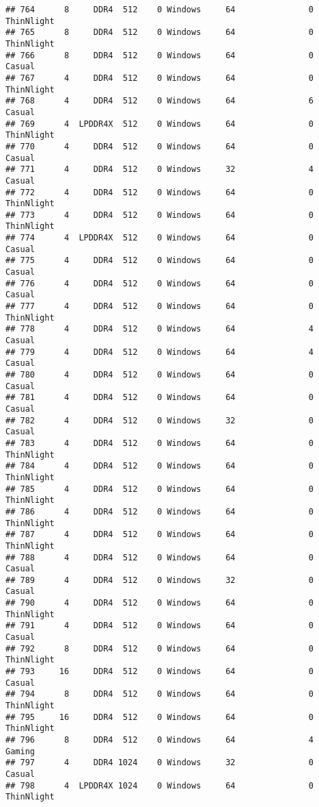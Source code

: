 \documentclass[
]{article}
\begin{document}
\begin{verbatim}
## 764      8     DDR4  512    0 Windows     64               0 ThinNlight
## 765      8     DDR4  512    0 Windows     64               0 ThinNlight
## 766      8     DDR4  512    0 Windows     64               0     Casual
## 767      4     DDR4  512    0 Windows     64               0 ThinNlight
## 768      4     DDR4  512    0 Windows     64               6     Casual
## 769      4  LPDDR4X  512    0 Windows     64               0 ThinNlight
## 770      4     DDR4  512    0 Windows     64               0     Casual
## 771      4     DDR4  512    0 Windows     32               4     Casual
## 772      4     DDR4  512    0 Windows     64               0 ThinNlight
## 773      4     DDR4  512    0 Windows     64               0 ThinNlight
## 774      4  LPDDR4X  512    0 Windows     64               0     Casual
## 775      4     DDR4  512    0 Windows     64               0     Casual
## 776      4     DDR4  512    0 Windows     64               0     Casual
## 777      4     DDR4  512    0 Windows     64               0 ThinNlight
## 778      4     DDR4  512    0 Windows     64               4     Casual
## 779      4     DDR4  512    0 Windows     64               4     Casual
## 780      4     DDR4  512    0 Windows     64               0     Casual
## 781      4     DDR4  512    0 Windows     64               0     Casual
## 782      4     DDR4  512    0 Windows     32               0     Casual
## 783      4     DDR4  512    0 Windows     64               0 ThinNlight
## 784      4     DDR4  512    0 Windows     64               0 ThinNlight
## 785      4     DDR4  512    0 Windows     64               0 ThinNlight
## 786      4     DDR4  512    0 Windows     64               0 ThinNlight
## 787      4     DDR4  512    0 Windows     64               0 ThinNlight
## 788      4     DDR4  512    0 Windows     64               0     Casual
## 789      4     DDR4  512    0 Windows     32               0     Casual
## 790      4     DDR4  512    0 Windows     64               0 ThinNlight
## 791      4     DDR4  512    0 Windows     64               0     Casual
## 792      8     DDR4  512    0 Windows     64               0 ThinNlight
## 793     16     DDR4  512    0 Windows     64               0     Casual
## 794      8     DDR4  512    0 Windows     64               0 ThinNlight
## 795     16     DDR4  512    0 Windows     64               0 ThinNlight
## 796      8     DDR4  512    0 Windows     64               4     Gaming
## 797      4     DDR4 1024    0 Windows     32               0     Casual
## 798      4  LPDDR4X 1024    0 Windows     64               0 ThinNlight

\end{verbatim}
\end{document}
